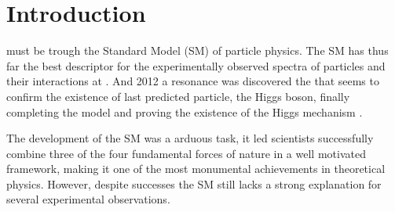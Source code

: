
\newpage

\chapter{Introduction}
\label{chapter:Introduction}


 must be  trough the Standard Model (SM) of particle physics. 
%
The SM has thus far  the best descriptor for the experimentally observed spectra of particles and their interactions at . 
%
And  2012\Joaoadd{,} a resonance was discovered  the  that seems to confirm the existence of  last predicted particle, the Higgs boson, finally completing the model and proving the existence of the Higgs mechanism \cite{Aad_2012,chatrchyan2012observation,
collaborations2015combined,collaborations2016measurements} . 

The development of the SM was a arduous task, it led scientists   successfully combine three of the four fundamental forces of nature in a  well motivated framework, making it one of the most monumental achievements in theoretical physics.
%
However, despite  successes the SM still lacks a strong explanation for several experimental observations. 

